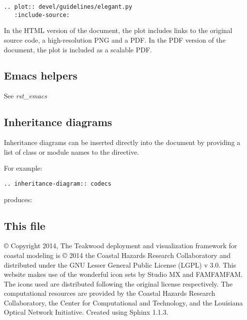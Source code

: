 \documentclass[letterpaper,10pt,openany, oneside]{sphinxmanual}
\begin{document}
\begin{Verbatim}[commandchars=\\\{\}]
.. plot:: devel/guidelines/elegant.py
   :include-source:
\end{Verbatim}

In the HTML version of the document, the plot includes links to the
original source code, a high-resolution PNG and a PDF.  In the PDF
version of the document, the plot is included as a scalable PDF.


\subsection{Emacs helpers}
\label{sample:emacs-helpers}
See \emph{rst\_emacs}


\subsection{Inheritance diagrams}
\label{sample:inheritance-diagrams}
Inheritance diagrams can be inserted directly into the document by
providing a list of class or module names to the
 directive.

For example:

\begin{Verbatim}[commandchars=\\\{\}]
.. inheritance-diagram:: codecs
\end{Verbatim}

produces:


\subsection{This file}
\label{sample:this-file}\label{sample:sphinx-literal}
© Copyright 2014, The Teakwood deployment and visualization framework for coastal modeling is © 2014 the Coastal Hazards Research Collaboratory and distributed under the GNU Lesser General Public License (LGPL) v 3.0. This website makes use of the wonderful icon sets by Studio MX and FAMFAMFAM. The icons used are distributed following the original license respectively. The computational resources are provided by the Coastal Hazards Research Collaboratory, the Center for Computational and Technology, and the Louisiana Optical Network Initiative. Created using Sphinx 1.1.3.



\renewcommand{\indexname}{Index}
\printindex
\end{document}
